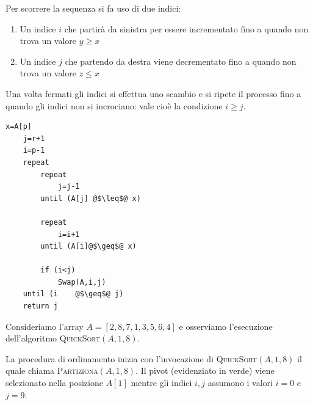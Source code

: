 \begin{center}
\end{center}

Per scorrere la sequenza si fa uso di due indici:
\begin{enumerate}
	\item Un indice $i$ che partirà da sinistra per essere incrementato fino a quando non trova un valore $y\geq x$
	\item Un indice $j$ che partendo da destra viene decrementato fino a quando non trova un valore $z \leq x$
\end{enumerate}
Una volta fermati gli indici si effettua uno scambio e si ripete il processo fino a quando gli indici non si incrociano: vale cioè la condizione $i \geq j$.

\begin{lstlisting}[caption={\textsc{Partiziona}(A,p,r)},label=alg:partiziona,language=asd]
	x=A[p]
	j=r+1
	i=p-1
	repeat
		repeat
			j=j-1
		until (A[j] @$\leq$@ x)

		repeat
			i=i+1
		until (A[i]@$\geq$@ x)

		if (i<j)
			Swap(A,i,j)
	until (i	@$\geq$@ j)
	return j
\end{lstlisting}

\begin{example}
	Consideriamo l'array $A=[2,8,7,1,3,5,6,4]$ e osserviamo l'esecuzione dell'algoritmo \textsc{QuickSort}$(A,1,8)$.
\end{example}

La procedura di ordinamento inizia con l'invocazione di \textsc{QuickSort}$(A,1,8)$ il quale chiama \textsc{Partiziona}$(A,1,8)$. Il pivot (evidenziato in verde) viene selezionato nella posizione $A[1]$ mentre gli indici $i,j$ assumono i valori $i=0$ e $j=9$:
	\begin{center}
	\end{center}


